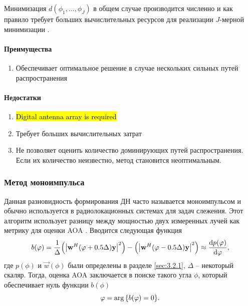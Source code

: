 Минимизация $d(\phi_1, \hdots, \phi_J)$ в общем случае производится численно и
как правило требует больших вычислительных ресурсов для реализации $J$-мерной
минимизации \cite{Tuncer2009}. 


\paragraph{Преимущества}%
\begin{enumerate}
    \item Обеспечивает оптимальное решение в случае нескольких сильных путей распространения 
\end{enumerate}

\paragraph{Недостатки}%
\begin{enumerate}
    \item \hl{Digital antenna array is required}
    \item Требует больших вычислительных затрат
    \item Не позволяет оценить количество доминирующих путей распространения. Если их количество неизвестно, метод становится неоптимальным. 
\end{enumerate}

\subsubsection{Метод моноимпульса}%
\label{sub:monopulse}

Данная разновидность формирования ДН часто называется моноимпульсом и обычно 
используется в радиолокационных системах для задач слежения. 
Этот алгоритм использует разницу между мощностью двух измеренных лучей как метрику для 
оценки AOA \cite{Tuncer2009}. Вводится следующая функция 
\begin{equation}
    \label{eq:3.11}
    b(\phi) = \frac{1}{\Delta} \qty(\abs{\vec w^H(\phi+0.5 \Delta)\vec y}^2)
    -
    \qty(\abs{\vec w^H(\phi-0.5 \Delta)\vec y}^2) \approx \dv{p(\phi)}{\phi} ,
\end{equation}
где $p(\phi)$ и $\vec w(\phi)$ были определены в разделе \ref{sec:3.2.1}, $\Delta$ -- некоторый скаляр. Тогда, оценка AOA
заключается в поиске такого угла $\phi$, который обеспечивает нуль функции $b(\phi)$
\begin{equation}
    \label{eq:3.12}
    \varphi = \arg\qty{b(\varphi) = 0}.
\end{equation}

